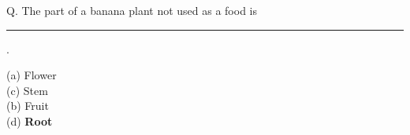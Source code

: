 \documentclass{article}
\newcommand{\mcqfour}[5]{
    \begin{flushleft}
        \color{red}
        Q. #1
        \textbf{}
    \end{flushleft}
    \begin{raggedright}
        \textbf{}
        \begin{multicols}{4}{}
            (a) #2\\
            (c) #3\\
            (b) #4\\
            (d) #5\\
            \end{multicols}
    \end{raggedright}
}
\begin{document}
  \mcqfour{The part of a banana plant not used as a food is \rule{1cm}{0.5mm} .}{Flower}{Stem}{Fruit}{\textbf{Root}}
\end{document}
